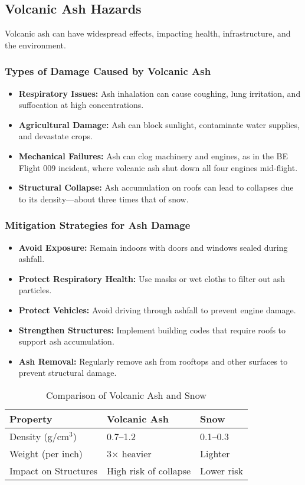 \documentclass{article}
\begin{document}
\subsection{Volcanic Ash Hazards}
Volcanic ash can have widespread effects, impacting health, infrastructure, and the environment.

\subsubsection{Types of Damage Caused by Volcanic Ash}
\begin{itemize}
    \item \textbf{Respiratory Issues:} Ash inhalation can cause coughing, lung irritation, and suffocation at high concentrations.
    \item \textbf{Agricultural Damage:} Ash can block sunlight, contaminate water supplies, and devastate crops.
    \item \textbf{Mechanical Failures:} Ash can clog machinery and engines, as in the BE Flight 009 incident, where volcanic ash shut down all four engines mid-flight.
    \item \textbf{Structural Collapse:} Ash accumulation on roofs can lead to collapses due to its density—about three times that of snow.
\end{itemize}

\subsubsection{Mitigation Strategies for Ash Damage}
\begin{itemize}
    \item \textbf{Avoid Exposure:} Remain indoors with doors and windows sealed during ashfall.
    \item \textbf{Protect Respiratory Health:} Use masks or wet cloths to filter out ash particles.
    \item \textbf{Protect Vehicles:} Avoid driving through ashfall to prevent engine damage.
    \item \textbf{Strengthen Structures:} Implement building codes that require roofs to support ash accumulation.
    \item \textbf{Ash Removal:} Regularly remove ash from rooftops and other surfaces to prevent structural damage.
\end{itemize}

\begin{table}[h]
\centering
\caption{Comparison of Volcanic Ash and Snow}
\begin{tabular}{@{}lll@{}}
\toprule
\textbf{Property}         & \textbf{Volcanic Ash} & \textbf{Snow} \\ \midrule
Density (g/cm$^3$)        & 0.7--1.2               & 0.1--0.3      \\
Weight (per inch)         & 3$\times$ heavier      & Lighter        \\
Impact on Structures      & High risk of collapse  & Lower risk     \\ \bottomrule
\end{tabular}
\end{table}
\end{document}
